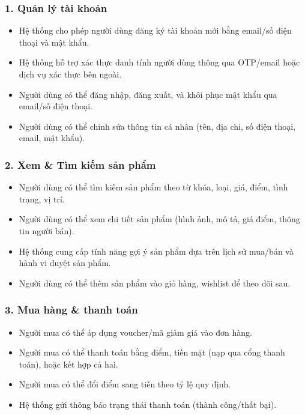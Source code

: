 \documentclass{article}
\begin{document}
\subsubsection*{1. Quản lý tài khoản}
\begin{itemize}
    \item Hệ thống cho phép người dùng đăng ký tài khoản mới bằng email/số điện thoại và mật khẩu.
    \item Hệ thống hỗ trợ xác thực danh tính người dùng thông qua OTP/email hoặc dịch vụ xác thực bên ngoài.
    \item Người dùng có thể đăng nhập, đăng xuất, và khôi phục mật khẩu qua email/số điện thoại.
    \item Người dùng có thể chỉnh sửa thông tin cá nhân (tên, địa chỉ, số điện thoại, email, mật khẩu).
\end{itemize}

\subsubsection*{2. Xem \& Tìm kiếm sản phẩm}
\begin{itemize}
    \item Người dùng có thể tìm kiếm sản phẩm theo từ khóa, loại, giá, điểm, tình trạng, vị trí.
    \item Người dùng có thể xem chi tiết sản phẩm (hình ảnh, mô tả, giá điểm, thông tin người bán).
    \item Hệ thống cung cấp tính năng gợi ý sản phẩm dựa trên lịch sử mua/bán và hành vi duyệt sản phẩm.
    \item Người dùng có thể thêm sản phẩm vào giỏ hàng, wishlist để theo dõi sau.

\end{itemize}

\subsubsection*{3. Mua hàng \& thanh toán}
\begin{itemize}
    \item Người mua có thể áp dụng voucher/mã giảm giá vào đơn hàng.
    \item Người mua có thể thanh toán bằng điểm, tiền mặt (nạp qua cổng thanh toán), hoặc kết hợp cả hai.
    \item Người mua có thể đổi điểm sang tiền theo tỷ lệ quy định.
    \item Hệ thống gửi thông báo trạng thái thanh toán (thành công/thất bại).
\end{itemize}
\end{document}
